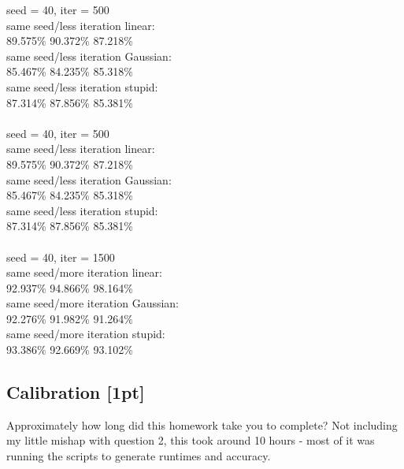 \documentclass[submit]{harvardml}
\begin{document}
\noindent seed = 40, iter = 500\\
same seed/less iteration linear:\\
89.575\%
90.372\%
87.218\%\\
same seed/less iteration Gaussian:\\
85.467\%
84.235\%
85.318\%\\
same seed/less iteration stupid:\\
87.314\%
87.856\%
85.381\%\\\\

\noindent seed = 40, iter = 500\\
same seed/less iteration linear:\\
89.575\%
90.372\%
87.218\%\\
same seed/less iteration Gaussian:\\
85.467\%
84.235\%
85.318\%\\
same seed/less iteration stupid:\\
87.314\%
87.856\%
85.381\%\\\\

\noindent seed = 40, iter = 1500\\
same seed/more iteration linear:\\
92.937\%
94.866\%
98.164\%\\
same seed/more iteration Gaussian:\\
92.276\%
91.982\%
91.264\%\\
same seed/more iteration stupid:\\
93.386\%
92.669\%
93.102\%
\newpage 

\subsection*{Calibration [1pt]}
Approximately how long did this homework take you to complete?
Not including my little mishap with question 2, this took around 10 hours - most of it was running the scripts to generate runtimes and accuracy. 
\end{document}
